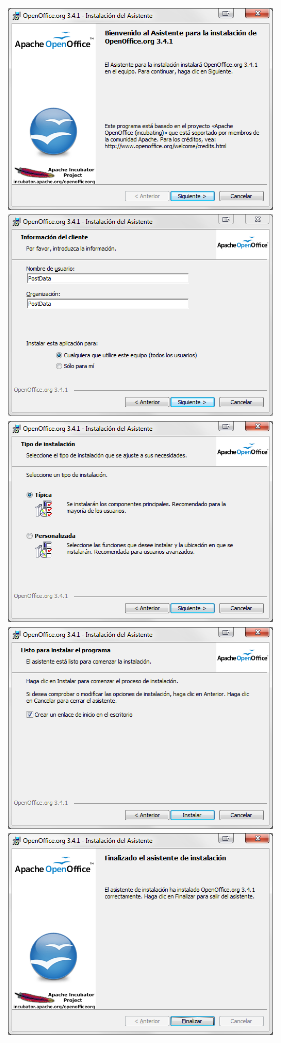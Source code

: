 \documentclass[10pt,a4paper]{article}\usepackage[]{graphicx}\usepackage[]{color}
\begin{document}
    \begin{center}
    \includegraphics[width=7cm]{../fig/Tut00-WebOpenOffice-06.png}\hspace{1cm}\includegraphics[width=7cm]{../fig/Tut00-WebOpenOffice-07.png}\\[5mm]
    \includegraphics[width=7cm]{../fig/Tut00-WebOpenOffice-08.png}\hspace{1cm}\includegraphics[width=7cm]{../fig/Tut00-WebOpenOffice-09.png}\\[5mm]
    \includegraphics[width=7cm]{../fig/Tut00-WebOpenOffice-11.png}
    \end{center}
\end{document}
